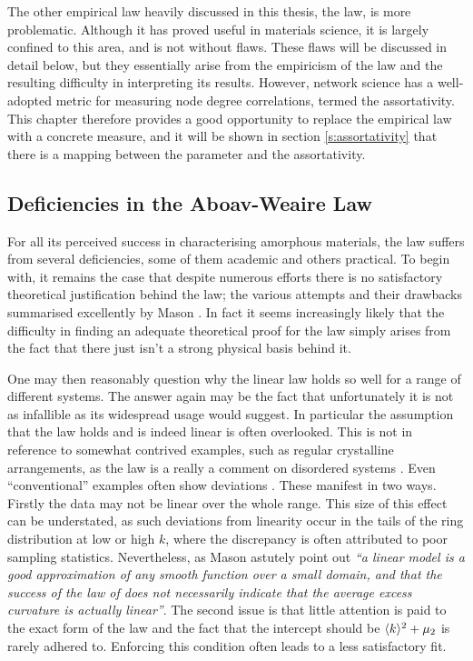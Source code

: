 The other empirical law heavily discussed in this thesis, the \aw{} law, is more problematic.
Although it has proved useful in materials science, it is largely confined to this area, and is not without flaws.
These flaws will be discussed in detail below, but they essentially arise from the empiricism of the law and the resulting difficulty in interpreting its results.
However, network science has a well\--adopted metric for measuring node degree correlations, termed the assortativity.  
This chapter therefore provides a good opportunity to replace the empirical \aw{} law with a concrete measure, and it will be shown in section \ref{s:assortativity} that there is a mapping between the \aw{} parameter and the assortativity.

\subsection{Deficiencies in the Aboav\--Weaire Law}

For all its perceived success in characterising amorphous materials, the \aw{} law suffers from several deficiencies, some of them academic and others practical.
To begin with, it remains the case that despite numerous efforts \cite{Lambert1981,Kumar1994,Blanc1979,Rivier1985,Peshkin1991,Chiu1994} there is no satisfactory theoretical justification behind the \aw{} law; the various attempts and their drawbacks summarised excellently by Mason \etal{} \cite{Mason2012}.
In fact it seems increasingly likely that the difficulty in finding an adequate theoretical proof for the \aw{} law simply arises from the fact that there just isn't a strong physical basis behind it.

One may then reasonably question why the linear \aw{} law holds so well for a range of different systems.
The answer again may be the fact that unfortunately it is not as infallible as its widespread usage would suggest.
In particular the assumption that the law holds and is indeed linear is often overlooked.
This is not in reference to somewhat contrived examples, such as regular crystalline arrangements, as the \aw{} law is a really a comment on disordered systems \cite{Boots1984}.
Even ``conventional'' examples often show deviations \cite{Earnshaw1994,Kumar1994,Hilhorst2006}.
These manifest in two ways.
Firstly the data may not be linear over the whole range.
This size of this effect can be understated, as such deviations from linearity occur in the tails of the ring distribution at low or high $k$, where the discrepancy is often attributed to poor sampling statistics.
Nevertheless, as Mason \etal{} astutely point out \textit{``a linear model is a good approximation of any smooth function over a small domain, and that the success of the law of \aw{} does not necessarily indicate that the average excess curvature is actually linear''}.
The second issue is that little attention is paid to the exact form of the law and the fact that the intercept should be $\langle k \rangle^2+\mu_2$ is rarely adhered to.
Enforcing this condition often leads to a less satisfactory fit. 

